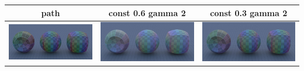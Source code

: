 \documentclass[11pt]{article}
\begin{document}
\begin{table}[ht]
  \centering
  \begin{tabular}{ | c | c | c |}
    \hline
    path & const 0.6 gamma 2 & const 0.3 gamma 2 \\ \hline
    \begin{minipage}{.3\textwidth}
      \includegraphics[scale=0.1]{img/obj/simple_el/simple_el.jpg}
    \end{minipage}
    &
    \begin{minipage}{.3\textwidth}
      \includegraphics[scale=0.1]{img/obj/simple_el/simple_el_disney.jpg}
    \end{minipage}
    & 
    \begin{minipage}{.3\textwidth}
      \includegraphics[scale=0.1]{img/obj/simple_el/simple_el_disney_dc03.jpg}
    \end{minipage}
    \\ \hline
  \end{tabular}
\end{table}
\end{document}
